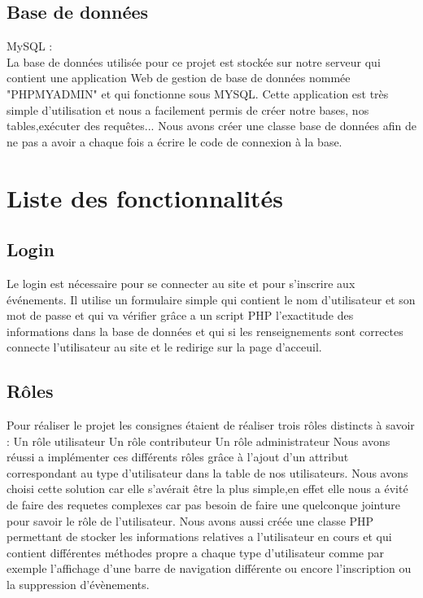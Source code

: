 \documentclass[french]{article}
\begin{document}
            \subsection{Base de données}
            MySQL :\\ La base de données utilisée pour ce projet est stockée sur notre serveur qui contient une application Web de gestion de base de données nommée "PHPMYADMIN" et qui fonctionne sous MYSQL.
            Cette application est très simple d'utilisation et nous a facilement permis de créer notre bases, nos tables,exécuter des requêtes...
            Nous avons créer une classe base de données afin de ne pas a avoir a chaque fois a écrire le code de connexion à la base.
            
        \section{Liste des fonctionnalités}
            \subsection{Login}
            Le login est nécessaire pour se connecter au site et pour s'inscrire aux événements.
            Il utilise un formulaire simple qui contient le nom d'utilisateur et son mot de passe et qui va vérifier grâce a un script PHP l'exactitude des informations dans la base de données et qui si les renseignements sont correctes connecte l'utilisateur au site et le redirige sur la page d'acceuil.
            \subsection{Rôles}
            Pour réaliser le projet les consignes étaient de réaliser trois rôles distincts à savoir :
            Un rôle utilisateur
            Un rôle contributeur
            Un rôle administrateur
            Nous avons réussi a implémenter ces différents rôles grâce à l'ajout d'un attribut correspondant au type d'utilisateur dans la table de nos utilisateurs.
            Nous avons choisi cette solution car elle s'avérait être la plus simple,en effet elle nous a évité de faire des requetes complexes car pas besoin de faire une quelconque jointure pour savoir le rôle de l'utilisateur.
            Nous avons aussi créée une classe PHP permettant de stocker les informations relatives a l'utilisateur en cours et qui contient différentes méthodes propre a chaque type d'utilisateur comme par exemple l'affichage d'une barre de navigation différente ou encore l'inscription ou la suppression d'évènements. 
\end{document}
